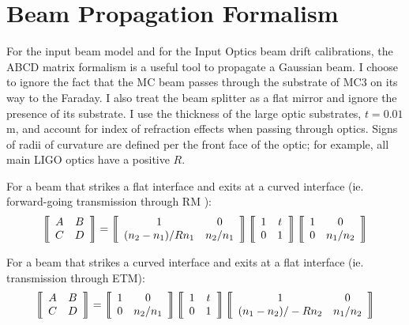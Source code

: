 \section{Beam Propagation Formalism}
For the input beam model and for the Input Optics beam drift
calibrations, the ABCD matrix formalism is a useful tool to propagate
a Gaussian beam. I choose to ignore the fact that the MC beam passes
through the substrate of MC3 on its way to the Faraday. I also treat
the beam splitter as a flat mirror and ignore the presence of its
substrate. I use the thickness of the large optic substrates, $t=0.01$
m, and account for index of refraction effects when passing through
optics. Signs of radii of curvature are defined per the front face of
the optic; for example, all main LIGO optics have a positive $R$.

For a beam that strikes a flat interface and exits at a curved
interface (ie. forward-going transmission through RM ):
\begin{equation}
\left\llbracket \begin{array}{c c}
A & B \\
C & D \end{array} \right\rrbracket = 
\left\llbracket \begin{array}{c c}
1 & 0 \\
(n_2-n_1)/Rn_1 & n_2/n_1 \end{array} \right\rrbracket
\left\llbracket \begin{array}{c c}
1 & t \\
0 & 1 \end{array} \right\rrbracket
\left\llbracket \begin{array}{c c}
1 & 0 \\
0 & n_1/n_2 \end{array} \right\rrbracket
\end{equation}

For a beam that strikes a curved interface and exits at a flat
interface (ie. transmission through ETM):
\begin{equation}
\left\llbracket \begin{array}{c c}
A & B \\
C & D \end{array} \right\rrbracket = 
\left\llbracket \begin{array}{c c}
1 & 0 \\
0 & n_2/n_1 \end{array} \right\rrbracket
\left\llbracket \begin{array}{c c}
1 & t \\
0 & 1 \end{array} \right\rrbracket
\left\llbracket \begin{array}{c c}
1 & 0 \\
(n_1-n_2)/-Rn_2 & n_1/n_2 \end{array} \right\rrbracket
\end{equation}

